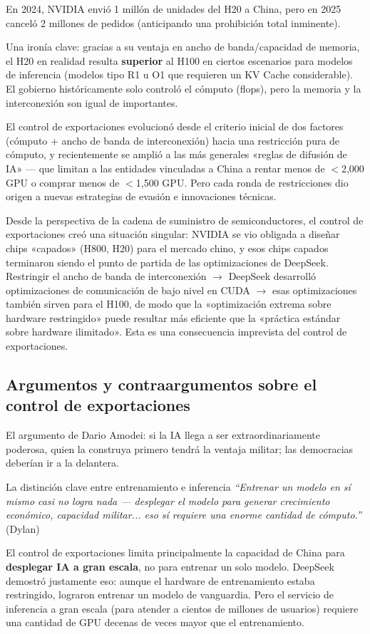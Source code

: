 \documentclass[a4paper]{article}
\begin{document}
En 2024, NVIDIA envió 1 millón de unidades del H20 a China, pero en 2025 canceló 2 millones de pedidos (anticipando una prohibición total inminente).

Una ironía clave: gracias a su ventaja en ancho de banda/capacidad de memoria, el H20 en realidad resulta \textbf{superior} al H100 en ciertos escenarios para modelos de inferencia (modelos tipo R1 u O1 que requieren un KV Cache considerable). El gobierno históricamente solo controló el cómputo (flops), pero la memoria y la interconexión son igual de importantes.

El control de exportaciones evolucionó desde el criterio inicial de dos factores (cómputo + ancho de banda de interconexión) hacia una restricción pura de cómputo, y recientemente se amplió a las más generales «reglas de difusión de IA» — que limitan a las entidades vinculadas a China a rentar menos de $<$2,000 GPU o comprar menos de $<$1,500 GPU. Pero cada ronda de restricciones dio origen a nuevas estrategias de evasión e innovaciones técnicas.

Desde la perspectiva de la cadena de suministro de semiconductores, el control de exportaciones creó una situación singular: NVIDIA se vio obligada a diseñar chips «capados» (H800, H20) para el mercado chino, y esos chips capados terminaron siendo el punto de partida de las optimizaciones de DeepSeek. Restringir el ancho de banda de interconexión $\to$ DeepSeek desarrolló optimizaciones de comunicación de bajo nivel en CUDA $\to$ esas optimizaciones también sirven para el H100, de modo que la «optimización extrema sobre hardware restringido» puede resultar más eficiente que la «práctica estándar sobre hardware ilimitado». Esta es una consecuencia imprevista del control de exportaciones.

\subsection{Argumentos y contraargumentos sobre el control de exportaciones}

El argumento de Dario Amodei: si la IA llega a ser extraordinariamente poderosa, quien la construya primero tendrá la ventaja militar; las democracias deberían ir a la delantera.

\begin{importantbox}{La distinción clave entre entrenamiento e inferencia}
\textit{``Entrenar un modelo en sí mismo casi no logra nada — desplegar el modelo para generar crecimiento económico, capacidad militar... eso sí requiere una enorme cantidad de cómputo.''} (Dylan)

El control de exportaciones limita principalmente la capacidad de China para \textbf{desplegar IA a gran escala}, no para entrenar un solo modelo. DeepSeek demostró justamente eso: aunque el hardware de entrenamiento estaba restringido, lograron entrenar un modelo de vanguardia. Pero el servicio de inferencia a gran escala (para atender a cientos de millones de usuarios) requiere una cantidad de GPU decenas de veces mayor que el entrenamiento.
\end{importantbox}
\end{document}
